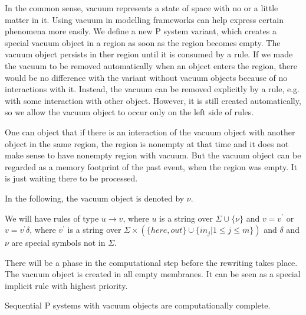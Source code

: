 In the common sense, vacuum represents a state of space with no or a little matter in it. Using vacuum in modelling frameworks can help express certain phenomena more easily. We define a new P system variant, which creates a special vacuum object in a region as soon as the region becomes empty.
The vacuum object persists in ther region until it is consumed by a rule.
If we made the vacuum to be removed automatically when an object enters the region, there would be no difference with the variant without vacuum objects because of no interactions with it. Instead, the vacuum can be removed explicitly by a rule, e.g. with some interaction with other object. However, it is still created automatically, so we allow the vacuum object to occur only on the left side of rules.

One can object that if there is an interaction of the vacuum object with another object in the same region, the region is nonempty at that time and it does not make sense to have nonempty region with vacuum. But the vacuum object can be regarded as a memory footprint of the past event, when the region was empty. It is just waiting there to be processed.

In the following, the vacuum object is denoted by $\nu$.

We will have rules of type $u\rightarrow v$, where $u$ is a string over $\Sigma\cup\{\nu\}$ and $v=v^\prime$ or $v=v^\prime\delta$, where $v^\prime$ is a string over $\Sigma\times(\{here, out\}\cup\{in_j|1\leq j\leq m\})$ and $\delta$ and $\nu$ are special symbols not in $\Sigma$.

There will be a phase in the computational step before the rewriting takes place. The vacuum object is created in all empty membranes. It can be seen as a special implicit rule with highest priority.

\begin{veta}
   Sequential P systems with vacuum objects are computationally complete.
\end{veta}

